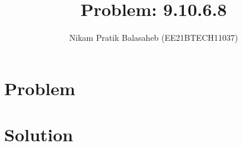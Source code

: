 \documentclass[journal,12pt,twocolumn]{IEEEtran}
\begin{document}
\let\StandardTheFigure\thefigure
\let\vec\mathbf
\renewcommand{\thefigure}{\theproblem}



\def\putbox#1#2#3{\makebox[0in][l]{\makebox[#1][l]{}\raisebox{\baselineskip}[0in][0in]{\raisebox{#2}[0in][0in]{#3}}}}
     \def\rightbox#1{\makebox[0in][r]{#1}}
     \def\centbox#1{\makebox[0in]{#1}}
     \def\topbox#1{\raisebox{-\baselineskip}[0in][0in]{#1}}
     \def\midbox#1{\raisebox{-0.5\baselineskip}[0in][0in]{#1}}

\vspace{3cm}


\title{Problem: 9.10.6.8}
\author{Nikam Pratik Balasaheb (EE21BTECH11037)}





\maketitle

\newpage


\bigskip

\renewcommand{\thefigure}{\theenumi}
\renewcommand{\thetable}{\theenumi}

\section{Problem}

\section{Solution}
\fi
\end{document}
